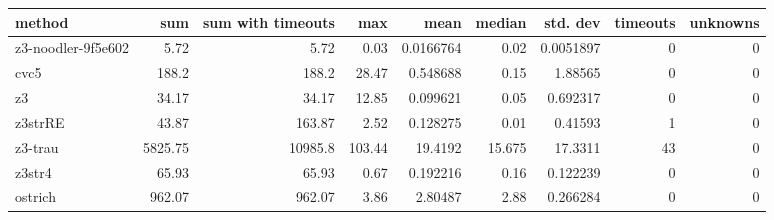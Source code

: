 \begin{tabular}{lrrrrrrrr}
\hline
 method             &     sum &   sum with timeouts &    max &       mean &   median &   std. dev &   timeouts &   unknowns \\
\hline
 z3-noodler-9f5e602 &    5.72 &                5.72 &   0.03 &  0.0166764 &    0.02  &  0.0051897 &          0 &          0 \\
 cvc5               &  188.2  &              188.2  &  28.47 &  0.548688  &    0.15  &  1.88565   &          0 &          0 \\
 z3                 &   34.17 &               34.17 &  12.85 &  0.099621  &    0.05  &  0.692317  &          0 &          0 \\
 z3strRE            &   43.87 &              163.87 &   2.52 &  0.128275  &    0.01  &  0.41593   &          1 &          0 \\
 z3-trau            & 5825.75 &            10985.8  & 103.44 & 19.4192    &   15.675 & 17.3311    &         43 &          0 \\
 z3str4             &   65.93 &               65.93 &   0.67 &  0.192216  &    0.16  &  0.122239  &          0 &          0 \\
 ostrich            &  962.07 &              962.07 &   3.86 &  2.80487   &    2.88  &  0.266284  &          0 &          0 \\
\hline
\end{tabular}

